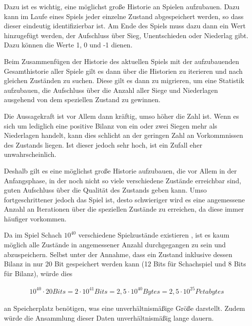 Dazu ist es wichtig, eine möglichst große Historie an Spielen aufzubauen. Dazu kann im Laufe eines Spiels jeder einzelne Zustand abgespeichert werden, so dass dieser eindeutig identifizierbar ist. Am Ende des Spiels muss dazu dann ein Wert hinzugefügt werden, der Aufschluss über Sieg, Unentschieden oder Niederlag gibt. Dazu können die Werte 1, 0 und -1 dienen.

Beim Zusammenfügen der Historie des aktuellen Spiels mit der aufzubauenden Gesamthistorie aller Spiele gilt es dann über die Historien zu iterieren und nach gleichen Zuständen zu suchen. Diese gilt es dann zu migrieren, um eine Statistik aufzubauen, die Aufschluss über die Anzahl aller Siege und Niederlagen ausgehend von dem speziellen Zustand zu gewinnen.

Die Aussagekraft ist vor Allem dann kräftig, umso höher die Zahl ist. Wenn es sich um lediglich eine positive Bilanz von ein oder zwei Siegen mehr als Niederlagen handelt, kann dies schlicht an der geringen Zahl an Vorkommnissen des Zustands liegen. Ist dieser jedoch sehr hoch, ist ein Zufall eher unwahrscheinlich.

Deshalb gilt es eine möglichst große Historie aufzubauen, die vor Allem in der Anfangsphase, in der noch nicht so viele verschiedene Zustände erreichbar sind, guten Aufschluss über die Qualität des Zustands geben kann. Umso fortgeschrittener jedoch das Spiel ist, desto schwieriger wird es eine angemessene Anzahl an Iterationen über die speziellen Zustände zu erreichen, da diese immer häufiger vorkommen.

Da im Spiel Schach $10^{40}$ verschiedene Spielzustände existieren \cite{Stroetmann2018} , ist es kaum möglich alle Zustände in angemessener Anzahl durchgegangen zu sein und abzuspeichern. Selbst unter der Annahme, dass ein Zustand inklusive dessen Bilanz in nur 20 Bit gespeichert werden kann (12 Bits für Schachspiel \cite{Speight} und 8 Bits für Bilanz), würde dies 

\begin{equation}
\begin{aligned}
10^{40}  \cdot  20 Bits = 2  \cdot  10^{41} Bits = 2,5  \cdot  10^{40} Bytes = 2,5  \cdot  10^{25} Petabytes
\end{aligned}
\end{equation}

an Speicherplatz benötigen, was eine unverhältnismäßige Größe darstellt. Zudem würde die Ansammlung dieser Daten unverhältnismäßig lange dauern.


